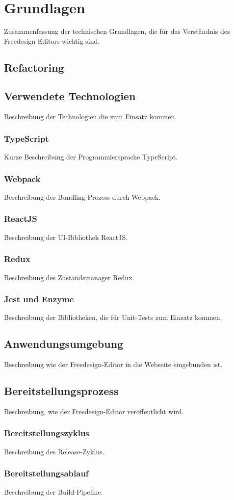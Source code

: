 \chapter{Grundlagen}
Zusammenfassung der technischen Grundlagen, die für das Verständnis des Freedesign-Editors wichtig sind.



\section{Refactoring}

\section{Verwendete Technologien}
Beschreibung der Technologien die zum Einsatz kommen.

\subsection{TypeScript}
Kurze Beschreibung der Programmiersprache TypeScript.

\subsection{Webpack}
Beschreibung des Bundling-Prozess durch Webpack.

\subsection{ReactJS}
Beschreibung der UI-Bibliothek ReactJS.

\subsection{Redux}
Beschreibung des Zustandsmanager Redux.

\subsection{Jest und Enzyme}
Beschreibung der Bibliotheken, die für Unit-Tests zum Einsatz kommen.

\section{Anwendungsumgebung}
Beschreibung wie der Freedesign-Editor in die Webseite eingebunden ist.

\section{Bereitstellungsprozess}
Beschreibung, wie der Freedesign-Editor veröffentlicht wird.

\subsection{Bereitstellungszyklus}
Beschreibung des Release-Zyklus.

\subsection{Bereitstellungsablauf}
Beschreibung der Build-Pipeline.
